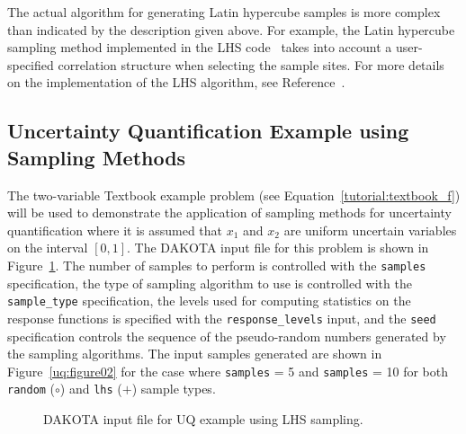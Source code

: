 The actual algorithm for generating Latin hypercube samples is more
complex than indicated by the description given above. For example,
the Latin hypercube sampling method implemented in the LHS
code~\cite{Swi04} takes into account a user-specified correlation
structure when selecting the sample sites. For more details on the
implementation of the LHS algorithm, see Reference~\cite{Swi04}.

\subsection{Uncertainty Quantification Example using Sampling Methods}\label{uq:uncertainty1}

The two-variable Textbook example problem (see
Equation~\ref{tutorial:textbook_f}) will be used to demonstrate
the application of sampling methods for uncertainty quantification
where it is assumed that $x_1$ and $x_2$ are uniform uncertain
variables on the interval $[0,1]$. The DAKOTA input file for this
problem is shown in Figure~\ref{uq:figure01}. The number of samples to
perform is controlled with the \texttt{samples} specification, the
type of sampling algorithm to use is controlled with the
\texttt{sample\_type} specification, the levels used for computing
statistics on the response functions is specified with the
\texttt{response\_levels} input, and the \texttt{seed} specification
controls the sequence of the pseudo-random numbers generated by the
sampling algorithms. The input samples generated are shown in
Figure~\ref{uq:figure02} for the case where \texttt{samples} = 5 and
\texttt{samples} = 10 for both \texttt{random} ($\circ$) and 
\texttt{lhs} ($+$) sample types.

\begin{figure}
  \centering \begin{bigbox} \begin{small}
   \end{small} \end{bigbox}
\caption{DAKOTA input file for UQ example using LHS sampling.}
\label{uq:figure01}
\end{figure}

